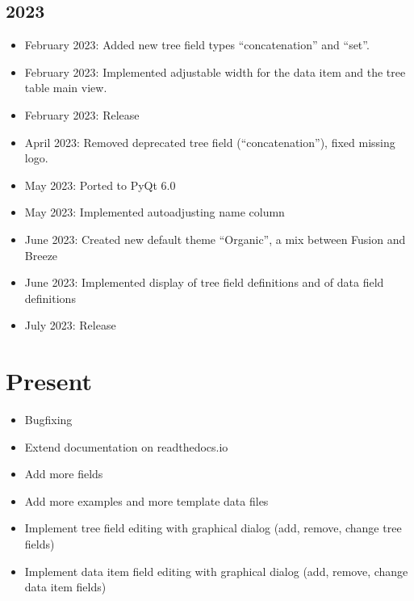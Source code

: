 \documentclass[letterpaper,10pt,english]{sphinxmanual}
\begin{document}
\subsection{2023}
\label{\detokenize{releases:id9}}\begin{itemize}
\item {} 
\sphinxAtStartPar
February 2023: Added new tree field types “concatenation” and “set”.

\item {} 
\sphinxAtStartPar
February 2023: Implemented adjustable width for the data item and the tree table main view.

\item {} 
\sphinxAtStartPar
February 2023: Release 

\item {} 
\sphinxAtStartPar
April 2023: Removed deprecated tree field (“concatenation”), fixed missing logo.

\item {} 
\sphinxAtStartPar
May 2023: Ported to PyQt 6.0

\item {} 
\sphinxAtStartPar
May 2023: Implemented auto\sphinxhyphen{}adjusting name column

\item {} 
\sphinxAtStartPar
June 2023: Created new default theme “Organic”, a mix between Fusion and Breeze

\item {} 
\sphinxAtStartPar
June 2023: Implemented display of tree field definitions and of data field definitions

\item {} 
\sphinxAtStartPar
July 2023: Release 

\end{itemize}


\section{Present}
\label{\detokenize{releases:present}}\begin{itemize}
\item {} 
\sphinxAtStartPar
Bugfixing

\item {} 
\sphinxAtStartPar
Extend documentation on readthedocs.io

\item {} 
\sphinxAtStartPar
Add more fields

\item {} 
\sphinxAtStartPar
Add more examples and more template data files

\item {} 
\sphinxAtStartPar
Implement tree field editing with graphical dialog (add, remove, change tree fields)

\item {} 
\sphinxAtStartPar
Implement data item field editing with graphical dialog (add, remove, change data item fields)

\end{itemize}
\end{document}
